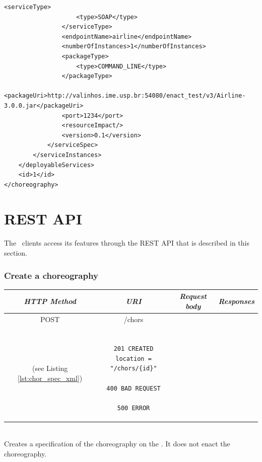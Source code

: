 {\begin{lstlisting}[breaklines, caption=Choreography XML representation example., label=lst:chor_xml]
                <serviceType>
                    <type>SOAP</type>
                </serviceType>
                <endpointName>airline</endpointName>
                <numberOfInstances>1</numberOfInstances>
                <packageType>
                    <type>COMMAND_LINE</type>
                </packageType>
                <packageUri>http://valinhos.ime.usp.br:54080/enact_test/v3/Airline-3.0.0.jar</packageUri>
                <port>1234</port>
                <resourceImpact/>
                <version>0.1</version>
            </serviceSpec>
        </serviceInstances>
    </deployableServices>
    <id>1</id>
</choreography>
\end{lstlisting}

}

\section{REST API}
\label{sec:api}

The \ee\ clients access its features through the REST API that is described in this section.

\subsubsection*{Create a choreography}

\begin{tabular}{|c|c|c|c|}
\hline 
\itshape{HTTP Method} & \itshape{URI} & \itshape{Request body} & \itshape{Responses} \\ 
\hline 
POST & /chors & 

\begin{minipage}{2in}
\verb!ChorSpec! XML representation \\ 
(see Listing \ref{lst:chor_spec_xml})
\end{minipage} 
&

\begin{minipage}{2in}
\begin{verbatim}

201 CREATED
location = "/chors/{id}"

400 BAD REQUEST

500 ERROR

\end{verbatim}
\end{minipage} 
\\ 
\hline 
\end{tabular} \\

Creates a specification of the choreography on the \ee.
It does not enact the choreography. 

